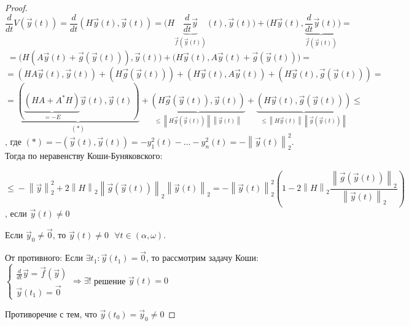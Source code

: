 \documentclass[12pt, a4paper]{report}
\begin{document}
\begin{proof}
    \[ \frac{d}{dt }  V (\vec{ y}  (t )) = \frac{d}{dt }  (H \vec{ y}  (t ) , \vec{ y}  (t )) = \bigg( H\underbrace{ \frac{d}{dt } \vec{ y}}_{\vec{ f   } (\vec{ y}  (t)) }  (t ), \vec{ y}  (t ) \bigg) + \bigg(  H \vec{ y}  (t ) , \underbrace{\frac{d}{dt }  \vec{ y }  (t)}_{\vec{ f } (\vec{ y}  (t))} \bigg) =\] 
    \[ = \bigg(  H (A \vec{ y}  (t ) + \vec{ g }  (\vec{ y}  (t ))) , \vec{ y}  (t ) \bigg)  + \bigg(  H \vec{ y}  (t ) , A \vec{ y}  (t ) + \vec{ g }  (\vec{ y }  (t)) \bigg)  = \] 
    \[  = (H A \vec{ y}  (t ) , \vec{ y}  (t ) ) + (H \vec{ g }  (\vec{ y }  (t ))) + (H \vec{ y } (t ) , A \vec{ y}  (t )) + ( H \vec{ y}  (t ) , \vec{ g }(\vec{ y}  (t)) ) = \] 
    \[ = \underbrace{(\underbrace{(H A + A ^* H )}_{= - E }\vec{ y}  (t ) ,\vec{ y}  (t ) )}_{(*)} + \underbrace{(H \vec{ g }  (\vec{ y } (t )), \vec{ y}  (t ))}_{\le  \left\lVert  H \vec{ g }  (\vec{ y}  (t ) ) \right\rVert \left\lVert  \vec{ y}  (t) \right\rVert}+ \underbrace{(H \vec{ y}  (t ) , \vec{ g }  (\vec{y }  (t))) }_{\le  \left\lVert  H \vec{ y}  (t ) \right\rVert \left\lVert  \vec{ g }  (\vec{ y } (t) ) \right\rVert} \boxed{\le }\]  
    , где \( (* ) = - (\vec{ y } (t ) , \vec{ y}  (t )) = - y_1 ^2 (t )  - ... - y_n ^2 (t ) = - \left\lVert \vec{y }  (t) \right\rVert _2 ^2  \). Тогда по неравенству Коши-Буняковского: 
    
    \[ \boxed{\le  } - \left\lVert  \vec{ y}   \right\rVert _2   ^2  + 2 \left\lVert H  \right\rVert _2  \left\lVert \vec{ g }  (\vec{ y}  (t ) ) \right\rVert  _2 \left\lVert \vec{ y }  (t) \right\rVert _2  =- \left\lVert  \vec{ y}  (t ) \right\rVert _2 ^2 \left( 1 - 2  \left\lVert  H  \right\rVert _2 \frac{ \left\lVert \vec{ g }  (\vec{ y }  (t)) \right\rVert _2 }{\left\lVert \vec{ y}  (t ) \right\rVert _2 }  \right) \] 
    , если \( \vec{ y}  (t ) \neq  0 \) 

    Если \( \vec{ y } _0 \neq  \vec{ 0}    \), то \( \vec{ y}  (t ) \neq  0\text{ }   \forall  t \in  (\alpha , \omega)\). 
    
    От противного: Если \( \exists  t_1 : \vec{ y}  (t_1 ) = \vec{ 0 }  \), то рассмотрим задачу Коши: \( \begin{cases}
    \displaystyle  \frac{d}{dt }  \vec{ y}  = \vec{ f } (\vec{ y}   ) \\ 
    \vec{ y}  (t_1 ) = \vec{ 0 }  
    \end{cases}  \Rightarrow \exists ! \) решение \( \vec{ y }  (t ) = 0 \) 

    Противоречие с тем, что \( \vec{ y}  (t_0) = \vec{ y  } _0 \neq  0 \) 


\end{proof}
\end{document}
